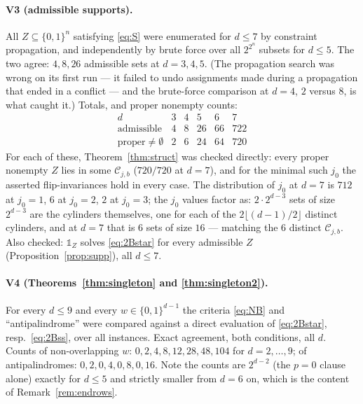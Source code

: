 \documentclass[11pt]{article}
\theoremstyle{definition}
\theoremstyle{remark}
\newcommand{\Cset}{\mathcal{C}}
\newcommand{\one}{\mathbb{1}}
\newcommand{\cube}{\{0,1\}}
\begin{document}
\paragraph{V3 (admissible supports).}  All $Z\subseteq\cube^{n}$ satisfying \eqref{eq:S} were
enumerated for $d\le7$ by constraint propagation, and independently by brute force over all
$2^{2^{n}}$ subsets for $d\le5$.  The two agree: $4,8,26$ admissible sets at $d=3,4,5$.  (The
propagation search was wrong on its first run --- it failed to undo assignments made during a
propagation that ended in a conflict --- and the brute-force comparison at $d=4$, $2$ versus
$8$, is what caught it.)  Totals, and proper nonempty counts:
\[
\begin{array}{r|ccccc}
 d & 3 & 4 & 5 & 6 & 7\\\hline
 \text{admissible} & 4 & 8 & 26 & 66 & 722\\
 \text{proper}\ne\emptyset & 2 & 6 & 24 & 64 & 720
\end{array}
\]
For each of these, Theorem~\ref{thm:struct} was checked directly: every proper nonempty $Z$ lies
in some $\Cset_{j,b}$ ($720/720$ at $d=7$), and for the minimal such $j_0$ the asserted
flip-invariances hold in every case.  The distribution of $j_0$ at $d=7$ is $712$ at $j_0=1$,
$6$ at $j_0=2$, $2$ at $j_0=3$; the $j_0$ values factor as: $2\cdot2^{d-3}$ sets of size
$2^{d-3}$ are the cylinders themselves, one for each of the $2\lfloor(d-1)/2\rfloor$ distinct
cylinders, and at $d=7$ that is $6$ sets of size $16$ --- matching the $6$ distinct
$\Cset_{j,b}$.  Also checked: $\one_Z$ solves \eqref{eq:2Bstar} for every admissible $Z$
(Proposition~\ref{prop:supp}), all $d\le7$.

\paragraph{V4 (Theorems~\ref{thm:singleton} and \ref{thm:singleton2}).}  For every $d\le9$ and
every $w\in\cube^{d-1}$ the criteria \eqref{eq:NB} and ``antipalindrome'' were compared against
a direct evaluation of \eqref{eq:2Bstar}, resp.\ \eqref{eq:2Bss}, over all instances.  Exact
agreement, both conditions, all $d$.  Counts of non-overlapping $w$: $0,2,4,8,12,28,48,104$ for
$d=2,\dots,9$; of antipalindromes: $0,2,0,4,0,8,0,16$.  Note the counts are $2^{d-2}$ (the
$p=0$ clause alone) exactly for $d\le5$ and strictly smaller from $d=6$ on, which is the content
of Remark~\ref{rem:endrows}.
\end{document}
